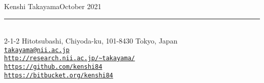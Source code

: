 {\Large\sc Kenshi Takayama}\hfill October 2021
\rule{\textwidth}{1pt}\\
{\small
2-1-2 Hitotsubashi, Chiyoda-ku, 101-8430 Tokyo, Japan\\
\href{mailto:takayama@nii.ac.jp}{{\tt takayama@nii.ac.jp}}\\
\href{http://research.nii.ac.jp/~takayama/}{{\tt http://research.nii.ac.jp/\~{}takayama/}}\\
\href{https://github.com/kenshi84}{{\tt https://github.com/kenshi84}}\\
\href{https://bitbucket.org/kenshi84}{{\tt https://bitbucket.org/kenshi84}}
}
\vspace{2mm}
